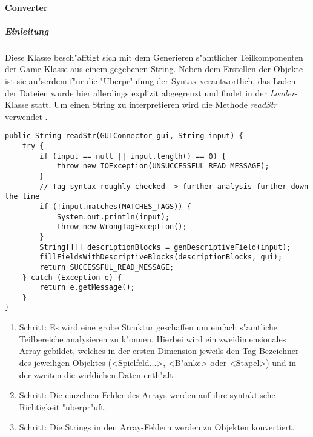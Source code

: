 \paragraph{Converter}
\label{par:converter}

\subparagraph{Einleitung}
Diese Klasse besch"afftigt sich mit dem Generieren s"amtlicher Teilkomponenten der Game-Klasse aus einem gegebenen String. Neben dem Erstellen der Objekte ist sie au"serdem f"ur die "Uberpr"ufung der Syntax verantwortlich, das Laden der Dateien wurde hier allerdings explizit abgegrenzt und findet in der \emph{Loader}-Klasse statt. Um einen String zu interpretieren wird die Methode \emph{readStr} verwendet . 

\begin{lstlisting}[style=CodeHighlighting,float,caption=Converter - readStr,label=lst:converter_readStr]
public String readStr(GUIConnector gui, String input) {
    try {
        if (input == null || input.length() == 0) {
            throw new IOException(UNSUCCESSFUL_READ_MESSAGE);
        }
        // Tag syntax roughly checked -> further analysis further down the line
        if (!input.matches(MATCHES_TAGS)) {
            System.out.println(input);
            throw new WrongTagException();
        }
        String[][] descriptionBlocks = genDescriptiveField(input);
        fillFieldsWithDescriptiveBlocks(descriptionBlocks, gui);
        return SUCCESSFUL_READ_MESSAGE;
    } catch (Exception e) {
        return e.getMessage();
    }
}
\end{lstlisting}

\begin{enumerate}
	\item Schritt: Es wird eine grobe Struktur geschaffen um einfach s"amtliche Teilbereiche analysieren zu k"onnen. Hierbei wird ein zweidimensionales Array gebildet, welches in der ersten Dimension jeweils den Tag-Bezeichner des jeweiligen Objektes (<Spielfeld...>, <B"anke> oder <Stapel>) und in der zweiten die wirklichen Daten enth"alt. 
	\item Schritt: Die einzelnen Felder des Arrays werden auf ihre syntaktische Richtigkeit "uberpr"uft.
	\item Schritt: Die Strings in den Array-Feldern werden zu Objekten konvertiert. 
\end{enumerate}

